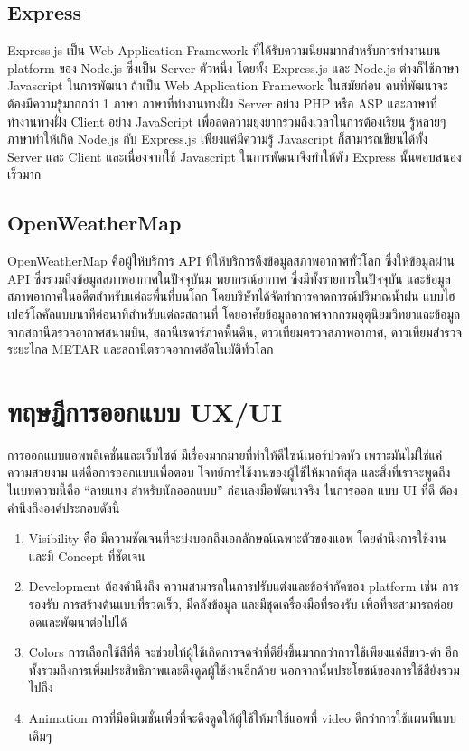 \subsection{Express}
Express.js เป็น Web Application Framework ที่ได้รับความนิยมมากสำหรับการทำงานบน platform ของ Node.js
ซึ่งเป็น Server ตัวหนึ่ง โดยทั้ง Express.js และ Node.js ต่างก็ใช้ภาษา Javascript ในการพัฒนา ถ้าเป็น Web
Application Framework ในสมัยก่อน คนที่พัฒนาจะต้องมีความรู้มากกว่า 1 ภาษา ภาษาที่ทำงานทางฝั่ง Server อย่าง PHP
หรือ ASP และภาษาที่ทำงานทางฝั่ง Client อย่าง JavaScript เพื่อลดความยุ่งยากรวมถึงเวลาในการต้องเรียน รู้หลายๆ ภาษาทำให้เกิด
Node.js กับ Express.js เพียงแค่มีความรู้ Javascript ก็สามารถเขียนได้ทั้ง Server และ Client และเนื่องจากใช้
Javascript ในการพัฒนาจึงทำให้ตัว Express นั้นตอบสนองเร็วมาก

\subsection{OpenWeatherMap}
OpenWeatherMap คือผู้ให้บริการ API ที่ให้บริการดึงข้อมูลสภาพอากาศทั่วโลก ซึ่งให้ข้อมูลผ่าน API ซึ่งรวมถึงข้อมูลสภาพอากาศในปัจจุบันม
พยากรณ์อากาศ ซึ่งมีทั้งรายการในปัจจุบัน และข้อมูลสภาพอากาศในอดีตสำหรับแต่ละพื่นที่บนโลก โดยบริษัทได้จัดทำการคาดการณ์ปริมาณน้ำฝน
แบบไฮเปอร์โลคัลแบบนาทีต่อนาทีสำหรับแต่ละสถานที่ โดยอาศัยข้อมูลอากาศจากกรมอุตุนิยมวิทยาและข้อมูลจากสถานีตรวจอากาศสนามบิน,
สถานีเรดาร์ภาคพื้นดิน, ดาวเทียมตรวจสภาพอากาศ, ดาวเทียมสำรวจระยะไกล METAR และสถานีตรวจอากาศอัตโนมัติทั่วโลก


\section{ทฤษฎีการออกแบบ UX/UI}
การออกแบบแอพพลิเคชั่นและเว็บไซต์ มีเรื่องมากมายที่ทำให้ดีไซน์เนอร์ปวดหัว เพราะมันไม่ใช่แค่ความสวยงาม แต่คือการออกแบบเพื่อตอบ
โจทย์การใช้งานของผู้ใช้ให้มากที่สุด และสิ่งที่เราจะพูดถึงในบทความนี้คือ “ลายแทง สำหรับนักออกแบบ” ก่อนลงมือพัฒนาจริง ในการออก
แบบ UI ที่ดี ต้องคำนึงถึงองค์ประกอบดังนี้
\begin{enumerate}
  \item Visibility คือ มีความชัดเจนที่จะบ่งบอกถึงเอกลักษณ์เฉพาะตัวของแอพ โดยคำนึงการใช้งาน และมี Concept ที่ชัดเจน
  \item Development ต้องคำนึงถึง ความสามารถในการปรับแต่งและข้อจำกัดของ platform เช่น การรองรับ การสร้างต้นแบบที่รวดเร็ว, มีคลังข้อมูล และมีชุดเครื่องมือที่รองรับ เพื่อที่จะสามารถต่อยอดและพัฒนาต่อไปได้
  \item Colors การเลือกใช้สีที่ดี จะช่วยให้ผู้ใช้เกิดการจดจำที่ดียิ่งขึ้นมากกว่าการใช้เพียงแค่สีขาว-ดำ อีกทั้งรวมถึงการเพิ่มประสิทธิภาพและดึงดูดผู้ใช้งานอีกด้วย นอกจากนั้นประโยชน์ของการใช้สียังรวมไปถึง
  \item Animation การที่มีอนิเมชั่นเพื่อที่จะดึงดูดให้ผู้ใช้ให้มาใช้แอพที่ video ดีกว่าการใช้แผนทีแบบเดิมๆ
\end{enumerate}

